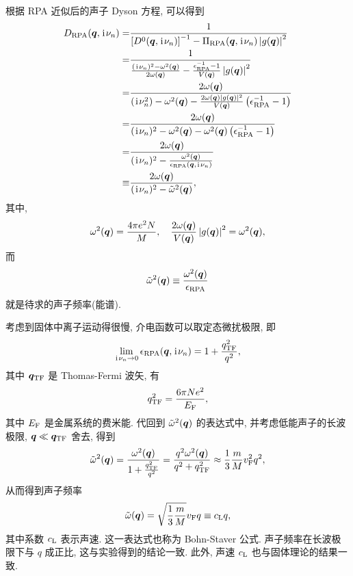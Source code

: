 根据 RPA 近似后的声子 Dyson 方程, 可以得到 
  \begin{align}
        D_{\mathrm{RPA}}(\boldsymbol{q},\hspace{0.1em}\mathrm{i}\hspace{0.1em}\nu_n)=&\frac{1}{\left[ D^{0}(\boldsymbol{q},\hspace{0.1em}\mathrm{i}\hspace{0.1em}\nu_n)\right]^{-1}-\Pi_{\mathrm{RPA}}(\boldsymbol{q},\hspace{0.1em}\mathrm{i}\hspace{0.1em}\nu_n)\left| g(\boldsymbol{q}) \right|^2}\nonumber\\
        =&\frac{1}{\frac{(\hspace{0.1em}\mathrm{i}\hspace{0.1em}\nu_n)^2-\omega^2(\boldsymbol{q})}{2\omega(\boldsymbol{q})}-\frac{\epsilon_{\mathrm{RPA}}^{-1}-1}{V(\boldsymbol{q})}\left| g(\boldsymbol{q}) \right|^2}\nonumber\\
        =&\frac{2\omega(\boldsymbol{q})}{(\hspace{0.1em}\mathrm{i}\hspace{0.1em}\nu_n^2)-\omega^2(\boldsymbol{q})-\frac{2\omega(\boldsymbol{q})|g(\boldsymbol{q})|^2}{V(\boldsymbol{q})}\left( \epsilon_{\mathrm{RPA}}^{-1}-1 \right)}\nonumber\\
        =&\frac{2\omega(\boldsymbol{q})}{(\hspace{0.1em}\mathrm{i}\hspace{0.1em}\nu_n)^2-\omega^2(\boldsymbol{q})- \omega^2(\boldsymbol{q})\left( \epsilon_{\mathrm{RPA}}^{-1}-1 \right)}\nonumber\\
        =&\frac{2\omega(\boldsymbol{q})}{(\hspace{0.1em}\mathrm{i}\hspace{0.1em}\nu_n)^2-\frac{\omega^2(\boldsymbol{q})}{\epsilon_{\mathrm{RPA}}(\boldsymbol{q},\hspace{0.1em}\mathrm{i}\hspace{0.1em}\nu_n)}}\nonumber\\
        \equiv &\frac{2\omega(\boldsymbol{q})}{(\hspace{0.1em}\mathrm{i}\hspace{0.1em}\nu_n)^2-\tilde{\omega}^2(\boldsymbol{q})},
    \end{align}
其中, 
\begin{equation}
    \omega^2(\boldsymbol{q})=\frac{4\pi e^2N}{M},\quad\frac{2\omega(\boldsymbol{q})}{V(\boldsymbol{q})}\left| g(\boldsymbol{q}) \right|^2 = \omega^2(\boldsymbol{q}),\label{pho-freq}
\end{equation}
而
\begin{equation}
    \tilde{\omega}^2(\boldsymbol{q})\equiv \frac{\omega^2(\boldsymbol{q})}{\epsilon_{\mathrm{RPA}}}
\end{equation}
就是待求的声子频率(能谱). 

考虑到固体中离子运动得很慢, 介电函数可以取定态微扰极限, 即 
\begin{equation}
    \lim_{\hspace{0.1em}\mathrm{i}\hspace{0.1em}\nu_n\to 0}\epsilon_{\mathrm{RPA}}(\boldsymbol{q},\hspace{0.1em}\mathrm{i}\hspace{0.1em}\nu_n)=1+\frac{q_{\mathrm{TF}}^2}{q^2},
\end{equation}
其中 $\boldsymbol{q}_{\mathrm{TF}}$ 是 Thomas-Fermi 波矢, 有 
\begin{equation}
    q_{\mathrm{TF}}^2=\frac{6\pi Ne^2}{E_{\mathrm{F}}},
\end{equation}
其中 $E_{\mathrm{F}}$ 是金属系统的费米能. 代回到 $\tilde{\omega}^2(\boldsymbol{q})$ 的表达式中, 并考虑低能声子的长波极限, $\boldsymbol{q}\ll \boldsymbol{q}_{\mathrm{TF}}$ 舍去, 得到 
\begin{equation}
    \tilde{\omega}^2(\boldsymbol{q})=\frac{\omega^2(\boldsymbol{q})}{1+\frac{q^2_{\mathrm{TF}}}{q^2}}=\frac{q^2\omega^2(\boldsymbol{q})}{q^2+q_{\mathrm{TF}}^2}\approx\frac{1}{3}\frac{m}{M}v_{\mathrm{F}}^2q^2,
\end{equation}
从而得到声子频率 
\begin{equation}
    \tilde{\omega}(\boldsymbol{q})=\sqrt{\frac{1}{3}\frac{m}{M}}v_{\mathrm{F}}q\equiv c_{\mathrm{L}}q,
\end{equation}
其中系数 $c_{\mathrm{L}}$ 表示声速. 这一表达式也称为 Bohn-Staver 公式. 声子频率在长波极限下与 $q$ 成正比, 这与实验得到的结论一致. 此外, 声速 $c_{\mathrm{L}}$ 也与固体理论的结果一致.

